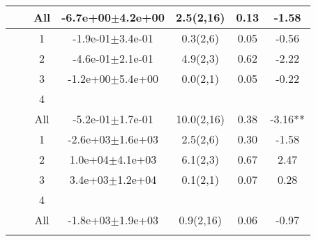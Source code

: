\begin{longtable}{llccccS[table-format=-2.2, table-space-text-post = {***}]}
   &  & All & -6.7e+00$\pm$4.2e+00 & 2.5(2,16) & 0.13 & -1.58 \\ 
   \midrule
{} & {} & 1 & -1.9e-01$\pm$3.4e-01 & 0.3(2,6) & 0.05 & -0.56 \\ 
   &  & 2 & -4.6e-01$\pm$2.1e-01 & 4.9(2,3) & 0.62 & -2.22 \\ 
   &  & 3 & -1.2e+00$\pm$5.4e+00 & 0.0(2,1) & 0.05 & -0.22 \\ 
   &  & 4 &  &  &  &  \\ 
   &  & All & -5.2e-01$\pm$1.7e-01 & 10.0(2,16) & 0.38 & -3.16** \\ 
   \midrule
{} & {} & 1 & -2.6e+03$\pm$1.6e+03 & 2.5(2,6) & 0.30 & -1.58 \\ 
   &  & 2 &  1.0e+04$\pm$4.1e+03 & 6.1(2,3) & 0.67 & 2.47 \\ 
   &  & 3 &  3.4e+03$\pm$1.2e+04 & 0.1(2,1) & 0.07 & 0.28 \\ 
   &  & 4 &  &  &  &  \\ 
   &  & All & -1.8e+03$\pm$1.9e+03 & 0.9(2,16) & 0.06 & -0.97 \\ 
   \bottomrule
\label{bivar_lm_summ}
\end{longtable}

